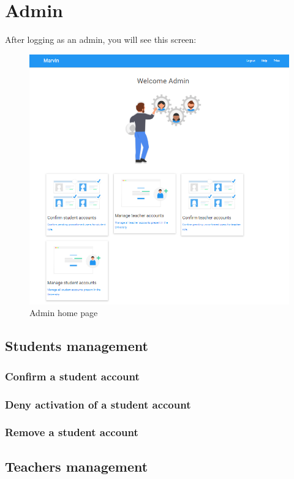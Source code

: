 \documentclass[ManualeUtente]{subfiles}
\begin{document}
\chapter{Admin}
After logging as an admin, you will see this screen:
\begin{figure}[H]
	\centering
	\includegraphics[width=1\linewidth]{image/Admin}
	\caption[Admin home page]{Admin home page}
	\label{fig:universityaddamin}
\end{figure}

\section{Students management}
\subsection{Confirm a student account}
\subsection{Deny activation of a student account}
\subsection{Remove a student account}


\section{Teachers management}
\end{document}
